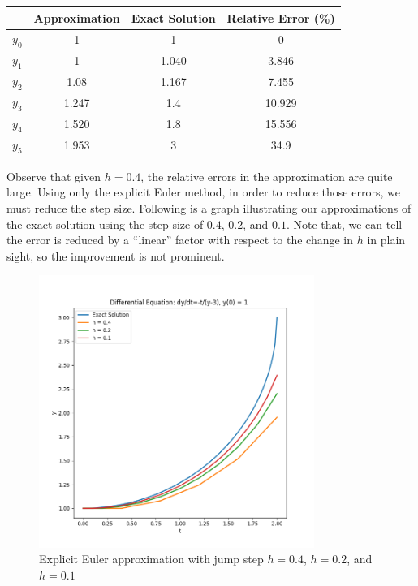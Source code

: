 \documentclass[a4paper]{article}
\numberwithin{equation}{section}
\begin{document}
\begin{table}[H]
  \centering
  \begin{tabular}{@{}cSSS@{}}
    \toprule
    {}      & {Approximation} & {Exact Solution} & {Relative Error (\%)} \\
    \midrule
    \(y_0\) & 1               & 1                & 0                     \\
    \(y_1\) & 1               & 1.040            & 3.846                 \\
    \(y_2\) & 1.08            & 1.167            & 7.455                 \\
    \(y_3\) & 1.247           & 1.4              & 10.929                \\
    \(y_4\) & 1.520           & 1.8              & 15.556                \\
    \(y_5\) & 1.953           & 3                & 34.9                  \\
    \bottomrule
  \end{tabular}
\end{table}

Observe that given \(h = 0.4\), the relative errors in the approximation are quite large. Using only the explicit Euler method, in order to reduce those errors, we must reduce the step size. Following is a graph illustrating our approximations of the exact solution using the step size of \(0.4\), \(0.2\), and \(0.1\). Note that, we can tell the error is reduced by a ``linear'' factor with respect to the change in \(h\) in plain sight, so the improvement is not prominent.

\begin{figure}[H]
  \centering
  \includegraphics[width=0.8\textwidth]{plot_euler.png}
  \caption{Explicit Euler approximation with jump step \(h = 0.4\), \(h = 0.2\), and \(h = 0.1\)}
\end{figure}
\end{document}
